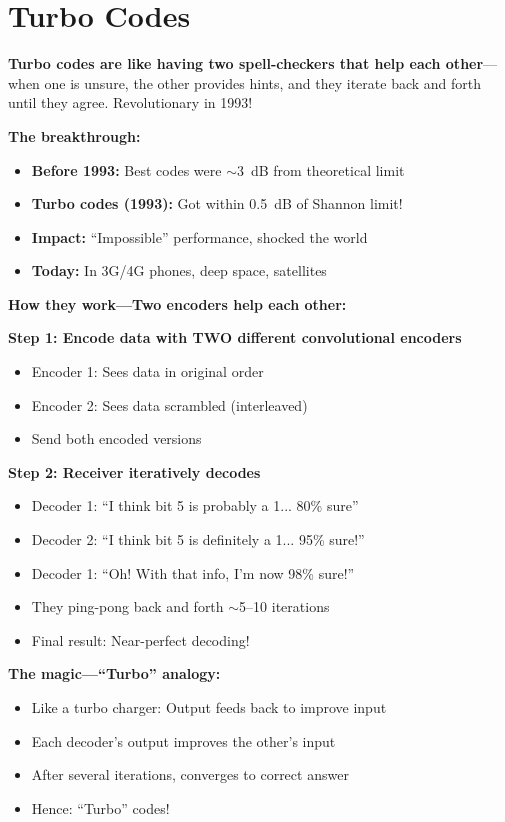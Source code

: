 \chapter{Turbo Codes}
\label{ch:turbo-codes}

\begin{nontechnical}
\textbf{Turbo codes are like having two spell-checkers that help each other}---when one is unsure, the other provides hints, and they iterate back and forth until they agree. Revolutionary in 1993!

\textbf{The breakthrough:}
\begin{itemize}
\item \textbf{Before 1993:} Best codes were $\sim$3~dB from theoretical limit
\item \textbf{Turbo codes (1993):} Got within 0.5~dB of Shannon limit!
\item \textbf{Impact:} ``Impossible'' performance, shocked the world
\item \textbf{Today:} In 3G/4G phones, deep space, satellites
\end{itemize}

\textbf{How they work---Two encoders help each other:}

\textbf{Step 1: Encode data with TWO different convolutional encoders}
\begin{itemize}
\item Encoder 1: Sees data in original order
\item Encoder 2: Sees data scrambled (interleaved)
\item Send both encoded versions
\end{itemize}

\textbf{Step 2: Receiver iteratively decodes}
\begin{itemize}
\item Decoder 1: ``I think bit 5 is probably a 1... 80\% sure''
\item Decoder 2: ``I think bit 5 is definitely a 1... 95\% sure!''
\item Decoder 1: ``Oh! With that info, I'm now 98\% sure!''
\item They ping-pong back and forth $\sim$5--10 iterations
\item Final result: Near-perfect decoding!
\end{itemize}

\textbf{The magic---``Turbo'' analogy:}
\begin{itemize}
\item Like a turbo charger: Output feeds back to improve input
\item Each decoder's output improves the other's input
\item After several iterations, converges to correct answer
\item Hence: ``Turbo'' codes!
\end{itemize}


\end{nontechnical}
